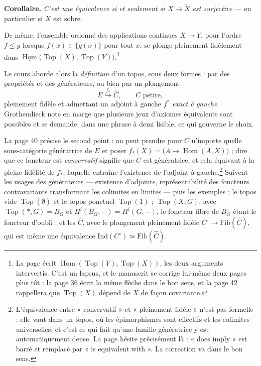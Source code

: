 \documentclass[11pt,a4paper]{article}
\begin{document}
\textbf{Corollaire.} \emph{C'est une équivalence si et seulement si
$X \to \widetilde{X}$ est surjective} — en particulier si $X$ est sobre.

De même, l'ensemble ordonné des applications continues $X \to Y$, pour l'ordre
$f \leq g$ lorsque $f(x) \in \overline{\{g(x)\}}$ pour tout $x$, se plonge
pleinement fidèlement dans $\underline{\operatorname{Hom}}\bigl(
\operatorname{Top}(X), \operatorname{Top}(Y)\bigr)$.\footnote{La page écrit
$\underline{\operatorname{Hom}}(\operatorname{Top}(Y), \operatorname{Top}(X))$,
les deux arguments intervertis. C'est un lapsus, et le manuscrit se corrige
lui-même deux pages plus tôt : la page 36 écrit la même flèche dans le bon
sens, et la page 42 rappellera que $\operatorname{Top}(X)$ dépend de $X$ de
façon covariante.}

Le cours aborde alors la \emph{définition} d'un topos, sous deux formes :
par des propriétés et des générateurs, ou bien par un plongement
\[
E \overset{f_{*}}{\hookrightarrow} \widehat{C},
\qquad C \text{ petite},
\]
pleinement fidèle et admettant un adjoint à gauche $f^{*}$ \emph{exact à
gauche}. Grothendieck note en marge que plusieurs jeux d'axiomes équivalents
sont possibles et se demande, dans une phrase à demi lisible, ce qui gouverne
le choix.

La page 40 précise le second point : on peut prendre pour $C$ n'importe quelle
sous-catégorie génératrice de $E$ et poser $f_{*}(X) = \bigl(A \mapsto
\operatorname{Hom}(A,X)\bigr)$ ; dire que ce foncteur est \emph{conservatif}
signifie que $C$ est génératrice, et cela équivaut à la pleine fidélité de
$f_{*}$, laquelle entraîne l'existence de l'adjoint à
gauche.\footnote{L'équivalence entre « conservatif » et « pleinement fidèle »
n'est pas formelle : elle vaut dans un topos, où les épimorphismes sont
effectifs et les colimites universelles, et c'est ce qui fait qu'une famille
génératrice y est automatiquement dense. La page hésite précisément là :
« does imply » est barré et remplacé par « is equivalent with ». La correction
va dans le bon sens.} Suivent les usages des générateurs — existence
d'adjoints, représentabilité des foncteurs contravariants transformant les
colimites en limites — puis les exemples : le topos vide
$\operatorname{Top}(\emptyset)$ et le topos ponctuel $\operatorname{Top}(1)$ ;
$\operatorname{Top}(X,G)$, avec $\operatorname{Top}(*,G) = B_{G}$ et
$H^{i}(B_{G}, -) = H^{i}(G,-)$, le foncteur fibre de $B_{G}$ étant le foncteur
d'oubli ; et les $\widehat{C}$, avec le plongement pleinement fidèle
$C^{\circ} \to \mathrm{Fib}(\widehat{C})$, qui est même une équivalence
$\mathrm{Ind}(C^{\circ}) \simeq \mathrm{Fib}(\widehat{C})$.
\end{document}
